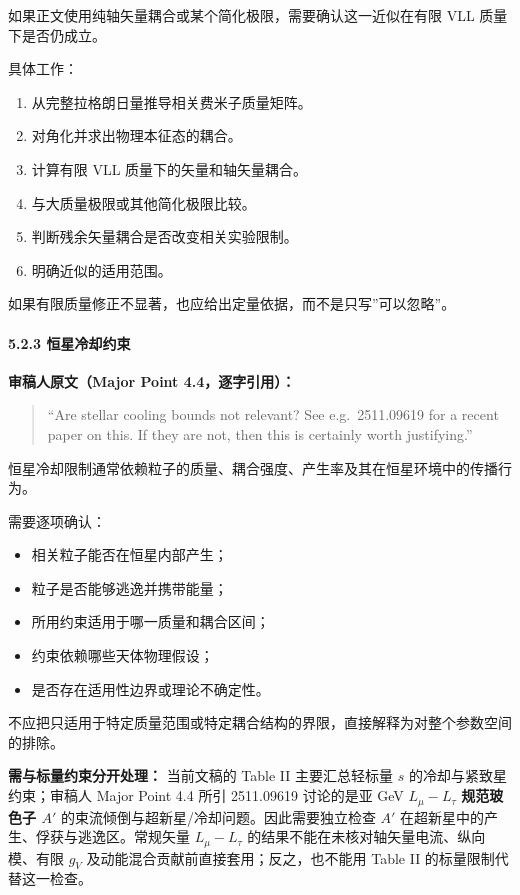 \documentclass[
]{article}
\providecommand{\tightlist}{%
  \setlength{\itemsep}{0pt}\setlength{\parskip}{0pt}}
\begin{document}
如果正文使用纯轴矢量耦合或某个简化极限，需要确认这一近似在有限 VLL
质量下是否仍成立。

具体工作：

\begin{enumerate}
\def\labelenumi{\arabic{enumi}.}
\tightlist
\item
  从完整拉格朗日量推导相关费米子质量矩阵。
\item
  对角化并求出物理本征态的耦合。
\item
  计算有限 VLL 质量下的矢量和轴矢量耦合。
\item
  与大质量极限或其他简化极限比较。
\item
  判断残余矢量耦合是否改变相关实验限制。
\item
  明确近似的适用范围。
\end{enumerate}

如果有限质量修正不显著，也应给出定量依据，而不是只写''可以忽略''。

\paragraph{5.2.3
恒星冷却约束}\label{ux6052ux661fux51b7ux5374ux7ea6ux675f}

\textbf{审稿人原文（Major Point 4.4，逐字引用）：}

\begin{quote}
``Are stellar cooling bounds not relevant? See e.g.~2511.09619 for a
recent paper on this. If they are not, then this is certainly worth
justifying.''
\end{quote}

恒星冷却限制通常依赖粒子的质量、耦合强度、产生率及其在恒星环境中的传播行为。

需要逐项确认：

\begin{itemize}
\tightlist
\item
  相关粒子能否在恒星内部产生；
\item
  粒子是否能够逃逸并携带能量；
\item
  所用约束适用于哪一质量和耦合区间；
\item
  约束依赖哪些天体物理假设；
\item
  是否存在适用性边界或理论不确定性。
\end{itemize}

不应把只适用于特定质量范围或特定耦合结构的界限，直接解释为对整个参数空间的排除。

\textbf{需与标量约束分开处理：} 当前文稿的 Table II 主要汇总轻标量 \(s\)
的冷却与紧致星约束；审稿人 Major Point 4.4 所引 2511.09619 讨论的是亚
GeV \(L_\mu-L_\tau\) \textbf{规范玻色子 \(A'\)}
的束流倾倒与超新星/冷却问题。因此需要独立检查 \(A'\)
在超新星中的产生、俘获与逃逸区。常规矢量 \(L_\mu-L_\tau\)
的结果不能在未核对轴矢量电流、纵向模、有限 \(g_V\)
及动能混合贡献前直接套用；反之，也不能用 Table II
的标量限制代替这一检查。
\end{document}

